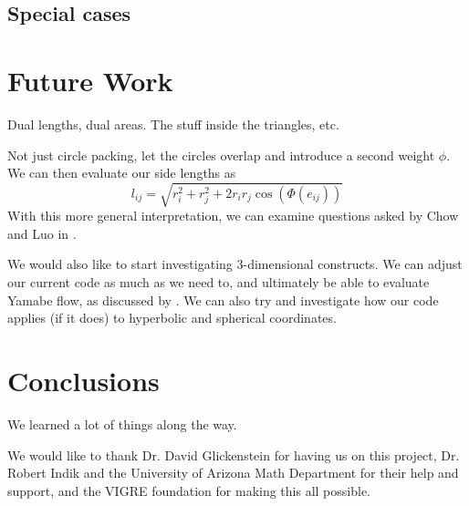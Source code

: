 \documentclass[12pt]{article}
\begin{document}
\subsection{Special cases}
\maketitle
  
  \newpage
  \section{Future Work}
  
  \maketitle
  \cite{DrG}
  \cite{chowluo}
  
  Dual lengths, dual areas. The stuff inside the triangles, etc. 
  
  Not just circle packing, let the circles overlap and introduce a second weight $\phi$. We can then evaluate our side lengths as $$l_{ij} = \sqrt{r_i^2 + r_j^2 + 2r_ir_j\cos(\Phi(e_{ij}))}$$ With this more general interpretation, we can examine questions asked by Chow and Luo in \cite{chowluo}.  
  
  We would also like to start investigating 3-dimensional constructs. We can adjust our current code as much as we need to, and ultimately be able to evaluate Yamabe flow, as discussed by \cite{DrG}. We can also try and investigate how our code applies (if it does) to hyperbolic and spherical coordinates.  
  
  \newpage
  \section{Conclusions}
  
  We learned a lot of things along the way.\newline
  
  \noindent We would like to thank Dr. David Glickenstein for having us on this project, Dr. Robert Indik and the University of Arizona Math Department for their help and support, and the VIGRE foundation for making this all possible. 
  \maketitle
   
  \newpage
    
  
  
\end{document}
